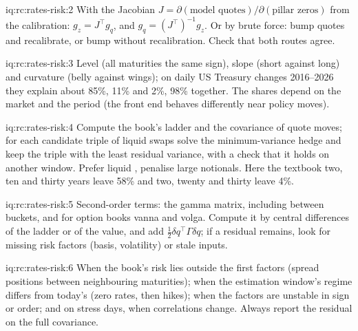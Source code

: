 \begin{solution}{iq:rc:rates-risk:2}
With the Jacobian $J = \partial(\text{model quotes})/\partial(\text{pillar
zeros})$ from the calibration: $g_z = J^\top g_q$, and $g_q =
(J^\top)^{-1}g_z$. Or by brute force: bump quotes and recalibrate, or bump
 without recalibration. Check that both routes agree.
\end{solution}

\begin{solution}{iq:rc:rates-risk:3}
Level (all maturities the same sign), slope (short against long) and curvature
(belly against wings); on daily US Treasury changes 2016--2026 they explain
about 85\%, 11\% and 2\%, 98\% together. The shares depend on the market and
the period (the front end behaves differently near policy moves).
\end{solution}

\begin{solution}{iq:rc:rates-risk:4}
Compute the book's ladder and the covariance of quote moves; for each
candidate triple of liquid swaps solve the minimum-variance hedge and keep the
triple with the least residual variance, with a check that it holds on another
window. Prefer liquid , penalise large notionals. Here the textbook
two, ten and thirty years leave 58\% and two, twenty and thirty leave 4\%.
\end{solution}

\begin{solution}{iq:rc:rates-risk:5}
Second-order terms: the gamma matrix, including  between buckets,
and for option books vanna and volga. Compute it by central differences of the
ladder or of the value, and add $\tfrac12\delta q^\top\Gamma\delta q$; if a
residual remains, look for missing risk factors (basis, volatility) or stale
inputs.
\end{solution}

\begin{solution}{iq:rc:rates-risk:6}
When the book's risk lies outside the first factors (spread positions between
neighbouring maturities); when the estimation window's regime differs from
today's (zero rates, then hikes); when the factors are unstable in sign or
order; and on stress days, when correlations change. Always report the residual
on the full covariance.
\end{solution}
